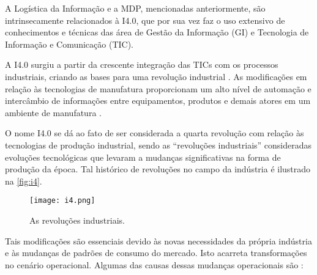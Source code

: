 A Logística da Informação e a MDP, mencionadas anteriormente, são intrinsecamente relacionados à I4.0, que por sua vez faz o uso extensivo de conhecimentos e técnicas das área de Gestão da Informação (GI) e Tecnologia de Informação e Comunicação (TIC).

A I4.0 surgiu a partir da crescente integração das TICs com os processos industriais, criando as bases para uma revolução industrial \cite{hermann2016design}. As modificações em relação às tecnologias de manufatura proporcionam um alto nível de automação e intercâmbio de informações entre equipamentos, produtos e demais atores em um ambiente de manufatura \cite{lasi2014industryfour}.

O nome I4.0 se dá ao fato de ser considerada a quarta revolução com relação às tecnologias de produção industrial, sendo as ``revoluções industriais'' consideradas evoluções tecnológicas que levaram a mudanças significativas na forma de produção da época. Tal histórico de revoluções no campo da indústria é ilustrado na \autoref{fig:i4}.

\begin{figure}[htb]
	\centering
	\texttt{[image: i4.png]}
	\caption{As revoluções industriais.}
	\label{fig:i4}
\end{figure}

Tais modificações são essenciais devido às novas necessidades da própria indústria e às mudanças de padrões de consumo do mercado. Isto acarreta transformações no cenário operacional. Algumas das causas dessas mudanças operacionais são \cite{lasi2014industryfour}:

